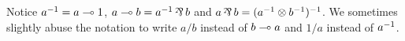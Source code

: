 Notice $a^{-1} = a \multimap{} 1$,  $a \ediv{} b = a^{-1} \dismul{} b$ and 
$a \dismul{} b = (a^{-1} \conmul{} b^{-1})^{-1}$. We sometimes slightly abuse the notation to write $a/b$ instead of $b \multimap a$ and $1/a$ instead of $a ^{-1}$.

\begin{comment}
\subsection{Measure Spaces and $p$-means}\label{p-mean}


\begin{definition}[Measure Space]
    Let $S$ be a set and $\sigmal{S}$ be a $\sigma$-algebra over $S$. 
    A \emph{measure} on $(S,\sigmal{S})$ is a function 
    $\mu : \sigmal{S} \rightarrow [0,\infty]$ such that (1) $\mu (\varnothing) 
    = 0$ and (2) if $\{ A_i : i \in I \}$ is a countable collection of pairwise 
    disjoint sets in $\sigmal{S}$ then
    \begin{equation}
        \mu \left( \bigcup_{i \in I} A_i \right) = \sum_{i \in I} \mu (A_i).
    \end{equation}
    The triple $(S, \sigmal{S}, \mu)$ is called a \emph{measure space}, and a 
    \emph{probability space} when $\mu(S)=1$, in which case $\mu$ is often 
    denoted as $\mathbb{P}$.
\end{definition}



\end{comment}
